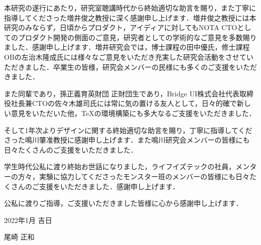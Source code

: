 \begin{acknowledgment}

本研究の遂行にあたり，研究室聴講時代から終始適切な助言を賜り，また丁寧に指導してくださった増井俊之教授に深く感謝申し上げます．増井俊之教授には本研究のみならず，日頃からプロダクト，アイディアに対してもNOTA CTOとしてのプロダクト開発の側面のご意見，研究者としての学術的なご意見を多数賜りました．感謝申し上げます．増井研究会では，博士課程の田中優氏，修士課程OBの左治木隆成氏には様々なご意見をいただき充実した研究会活動をさせていただきました．卒業生の皆様，研究会メンバーの民様にも多くのご支援をいただきました．

また同輩であり，孫正義育英財団\cite{masason} 正財団生であり，Bridge UI株式会社\cite{bridgeui}代表取締役社長兼CTOの佐々木雄司氏には常に気の置ける友人として，日々的確で新しい意見をいただいた他，\TeX の環境構築にも多大なるご支援をいただきました．

そして1年次よりデザインに関する終始適切な助言を賜り，丁寧に指導してくださった鳴川肇准教授に感謝申し上げます．また鳴川研究会メンバーの皆様にも日々たくさんのご支援をいただきました．

学生時代公私に渡り終始お世話になりました，ライフイズテックの社員，メンターの方々，実験に協力してくださったモンスター班のメンバーの皆様にも日々たくさんのご支援をいただきました．感謝申し上げます．

公私に渡りご指導，ご支援いただきました皆様に心から感謝申し上げます．
\begin{flushright}
2022年1月 吉日

尾崎 正和
\end{flushright}
\end{acknowledgment}
